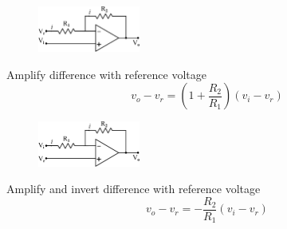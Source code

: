 \documentclass[a4 paper]{article}
\numberwithin{equation}{section}
\newcommand{\0}{\mathbf{0}}
\begin{document}
\begin{paracol}{2}
\begin{leftcolumn*}

\begin{figure}[!ht]
  \label{Non-inverting Amplifier}
  \centering
  \includegraphics[width=0.3\textwidth]{./images/non-inverting}
\end{figure}

Amplify difference with reference voltage
\begin{equation}
v_o-v_r = (1+\frac{R_2}{R_1})(v_i-v_r)
\end{equation}


\end{leftcolumn*}

\begin{rightcolumn}

\begin{figure}[ht]
  \label{Inverting Amplifier}
  \centering
  \includegraphics[width=0.3\textwidth]{./images/inverting}
\end{figure}
{Amplify and invert difference with reference voltage}
\begin{equation}
v_o-v_r = -\frac{R_2}{R_1}(v_i-v_r)
\end{equation}

\end{rightcolumn}
\end{paracol}














%
%
\end{document}
